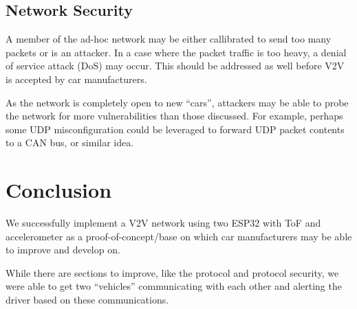 \documentclass[conference]{IEEEtran}
\begin{document}
\subsection{Network Security}
A member of the ad-hoc network may be either callibrated to send too many
packets or is an attacker. In a case where the packet traffic is too heavy, a
denial of service attack (DoS) may occur. This should be addressed as well
before V2V is accepted by car manufacturers.

As the network is completely open to new ``cars'', attackers may be able to
probe the network for more vulnerabilities than those discussed. For example,
perhaps some UDP misconfiguration could be leveraged to forward UDP packet
contents to a CAN bus, or similar idea.

\section{Conclusion}
We successfully implement a V2V network using two ESP32 with ToF and
accelerometer as a proof-of-concept/base on which car manufacturers may be able
to improve and develop on.

While there are sections to improve, like the protocol and protocol security, we
were able to get two ``vehicles'' communicating with each other and alerting the
driver based on these communications.



\end{document}
